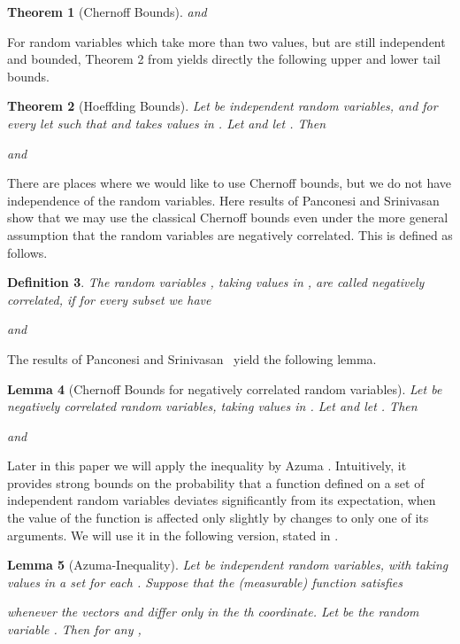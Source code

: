 \documentclass[12pt]{article}
\newtheorem{theorem}{Theorem}
\newtheorem{lemma}[theorem]{Lemma}
\newtheorem{defi}[theorem]{Definition}
\begin{document}
{\begin{theorem}[Chernoff Bounds]
and

\end{theorem}
For random variables which take more than two values, but are still independent and bounded, Theorem 2 from \cite{Hoe63} yields directly the following upper and lower tail bounds.
\begin{theorem}[Hoeffding Bounds]\label{thm:Hoeffding}
Let  be independent random variables, and for every  let  such that  and  takes
values in . Let  and let . Then 

 and

\end{theorem}
There are places where we would like to use Chernoff bounds, but we do not have independence of the random variables. Here results of Panconesi and Srinivasan~\cite{PS97,SrinFOCS2001} show that we may use the classical Chernoff bounds even under the more general assumption that the random variables are negatively correlated. This is defined as follows.

\begin{defi}
The random variables , taking
values in , are called {\emph{negatively correlated}}, if for every subset  we have 

and

\end{defi}
The results of Panconesi and Srinivasan~\cite{PS97,SrinFOCS2001} yield the following lemma.

\begin{lemma}[Chernoff Bounds for negatively correlated random variables]
\label{thm:chernoffnc}
Let  be negatively correlated random variables, taking
values in . Let  and let . Then 

and

\end{lemma}

Later in this paper we will apply the inequality by Azuma \cite{Azuma}. Intuitively, it provides strong bounds on the probability that a function defined on a set of independent random variables deviates significantly from its expectation, when the value of the function is affected only slightly by changes to only one of its arguments. 
We will use it in the following version, stated in \cite[Lemma 1.2]{mcdiarmid89}.

\begin{lemma}[Azuma-Inequality]
\label{thm:azuma} Let  be independent random variables, with  taking
values in a set  for each . Suppose that the (measurable) function  satisfies

whenever the vectors  and  differ only in the th coordinate. Let  be the random variable
. Then for any ,


\end{lemma}}
\end{document}
